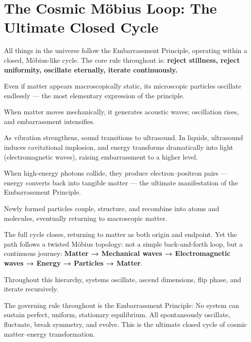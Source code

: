 \documentclass[10pt,a4paper]{article}
\begin{document}
\section*{The Cosmic Möbius Loop: The Ultimate Closed Cycle}
All things in the universe follow the Embarrassment Principle,
operating within a closed, Möbius-like cycle.
The core rule throughout is:
\textbf{reject stillness, reject uniformity, oscillate eternally, iterate continuously.}

Even if matter appears macroscopically static,
its microscopic particles oscillate endlessly —
the most elementary expression of the principle.

When matter moves mechanically, it generates acoustic waves;
oscillation rises, and embarrassment intensifies.

As vibration strengthens, sound transitions to ultrasound.
In liquids, ultrasound induces cavitational implosion,
and energy transforms dramatically into light (electromagnetic waves),
raising embarrassment to a higher level.

When high-energy photons collide, they produce electron–positron pairs —
energy converts back into tangible matter —
the ultimate manifestation of the Embarrassment Principle.

Newly formed particles couple, structure, and recombine
into atoms and molecules, eventually returning to macroscopic matter.

The full cycle closes, returning to matter as both origin and endpoint.
Yet the path follows a twisted Möbius topology:
not a simple back-and-forth loop,
but a continuous journey:
\textbf{Matter → Mechanical waves → Electromagnetic waves → Energy → Particles → Matter}.

Throughout this hierarchy, systems oscillate, ascend dimensions,
flip phase, and iterate recursively.

The governing rule throughout is the Embarrassment Principle:
No system can sustain perfect, uniform, stationary equilibrium.
All spontaneously oscillate, fluctuate, break symmetry, and evolve.
This is the ultimate closed cycle of cosmic matter–energy transformation.
\end{document}
